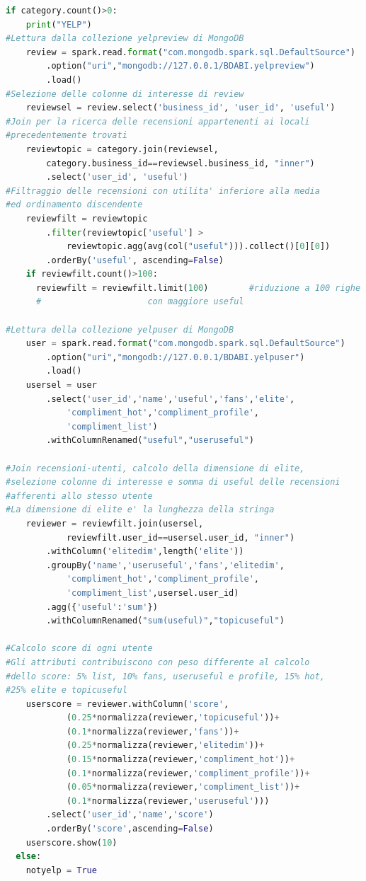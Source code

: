 \begin{lstlisting}[language=Python, caption={Expert Finding}, captionpos=b,label={lst:ef}]
  if category.count()>0:
    print("YELP")
#Lettura dalla collezione yelpreview di MongoDB
    review = spark.read.format("com.mongodb.spark.sql.DefaultSource")
    	.option("uri","mongodb://127.0.0.1/BDABI.yelpreview")
    	.load()
#Selezione delle colonne di interesse di review
    reviewsel = review.select('business_id', 'user_id', 'useful')
#Join per la ricerca delle recensioni appartenenti ai locali 
#precedentemente trovati
    reviewtopic = category.join(reviewsel,
    	category.business_id==reviewsel.business_id, "inner")
    	.select('user_id', 'useful')
#Filtraggio delle recensioni con utilita' inferiore alla media 
#ed ordinamento discendente
    reviewfilt = reviewtopic
    	.filter(reviewtopic['useful'] > 
    		reviewtopic.agg(avg(col("useful"))).collect()[0][0])
    	.orderBy('useful', ascending=False)
    if reviewfilt.count()>100:
      reviewfilt = reviewfilt.limit(100)        #riduzione a 100 righe 
      #						con maggiore useful

#Lettura della collezione yelpuser di MongoDB
    user = spark.read.format("com.mongodb.spark.sql.DefaultSource")
    	.option("uri","mongodb://127.0.0.1/BDABI.yelpuser")
    	.load()
    usersel = user
    	.select('user_id','name','useful','fans','elite',
    		'compliment_hot','compliment_profile',
    		'compliment_list')
    	.withColumnRenamed("useful","useruseful")

#Join recensioni-utenti, calcolo della dimensione di elite, 
#selezione colonne di interesse e somma di useful delle recensioni 
#afferenti allo stesso utente
#La dimensione di elite e' la lunghezza della stringa
    reviewer = reviewfilt.join(usersel, 
    		reviewfilt.user_id==usersel.user_id, "inner")
    	.withColumn('elitedim',length('elite'))
    	.groupBy('name','useruseful','fans','elitedim',
    		'compliment_hot','compliment_profile',
    		'compliment_list',usersel.user_id)
    	.agg({'useful':'sum'})
    	.withColumnRenamed("sum(useful)","topicuseful")

#Calcolo score di ogni utente
#Gli attributi contribuiscono con peso differente al calcolo 
#dello score: 5% list, 10% fans, useruseful e profile, 15% hot, 
#25% elite e topicuseful
    userscore = reviewer.withColumn('score', 
	    	(0.25*normalizza(reviewer,'topicuseful'))+
	    	(0.1*normalizza(reviewer,'fans'))+
	    	(0.25*normalizza(reviewer,'elitedim'))+
	    	(0.15*normalizza(reviewer,'compliment_hot'))+
	    	(0.1*normalizza(reviewer,'compliment_profile'))+
	    	(0.05*normalizza(reviewer,'compliment_list'))+
	    	(0.1*normalizza(reviewer,'useruseful')))
    	.select('user_id','name','score')
    	.orderBy('score',ascending=False)
    userscore.show(10)
  else:
    notyelp = True


\end{lstlisting}
